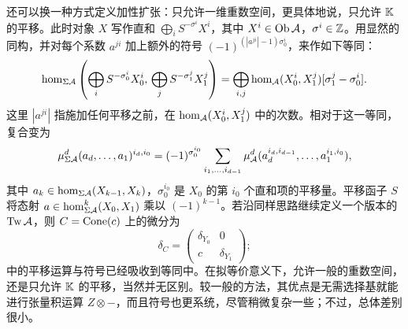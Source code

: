 \begin{note}\label{st:3.26}
还可以换一种方式定义加性扩张：只允许一维重数空间，更具体地说，只允许 $\mathbb K$ 的平移。此时对象 $X$ 写作直和 $\bigoplus_iS^{-\sigma^i}X^i$，其中 $X^i\in\operatorname{Ob}\mathcal A$，$\sigma^i\in\mathbb Z$。用显然的同构，并对每个系数 $a^{ji}$ 加上额外的符号 $(-1)^{(|a^{ji}|-1)\sigma_0^i}$，来作如下等同：
\begin{equation}\label{eq:3.29}
\hom_{\Sigma\mathcal A}\left(\bigoplus_iS^{-\sigma_0^i}X_0^i,\,\bigoplus_jS^{-\sigma_1^j}X_1^j\right)
=\bigoplus_{i,j}\hom_{\mathcal A}(X_0^i,X_1^j)[\sigma_1^j-\sigma_0^i].
\end{equation}
这里 $|a^{ji}|$ 指施加任何平移之前，在 $\hom_{\mathcal A}(X_0^i,X_1^j)$ 中的次数。相对于这一等同，复合变为
\[
\mu^d_{\Sigma\mathcal A}(a_d,\ldots,a_1)^{i_d,i_0}
=(-1)^{\sigma_0^{i_0}}\sum_{i_1,\ldots,i_{d-1}}\mu^d_{\mathcal A}(a_d^{i_d,i_{d-1}},\ldots,a_1^{i_1,i_0}),
\]
其中 $a_k\in\hom_{\Sigma\mathcal A}(X_{k-1},X_k)$，$\sigma_0^{i_0}$ 是 $X_0$ 的第 $i_0$ 个直和项的平移量。平移函子 $S$ 将态射 $a\in\hom^k_{\Sigma\mathcal A}(X_0,X_1)$ 乘以 $(-1)^{k-1}$。若沿同样思路继续定义一个版本的 $\operatorname{Tw}\mathcal A$，则 $C=\operatorname{Cone}(c)$ 上的微分为
\[
\delta_C=\begin{pmatrix}\delta_{Y_0}&0\\c&\delta_{Y_1}\end{pmatrix};
\]
中的平移运算与符号已经吸收到等同中。在拟等价意义下，允许一般的重数空间，还是只允许 $\mathbb K$ 的平移，当然并无区别。较一般的方法，其优点是无需选择基就能进行张量积运算 $Z\otimes-$，而且符号也更系统，尽管稍微复杂一些；不过，总体差别很小。
\end{note}

